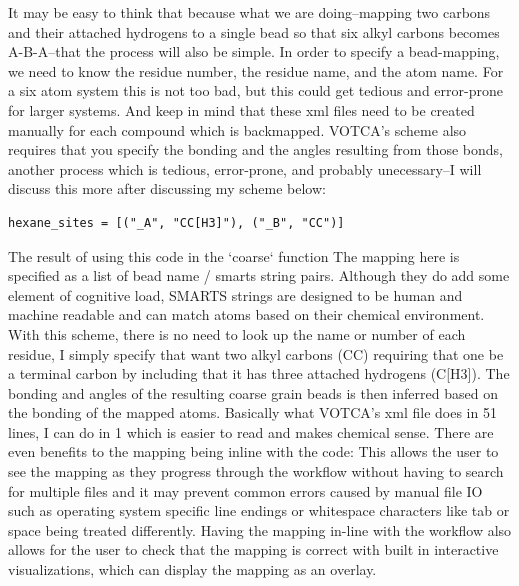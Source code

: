 It may be easy to think that because what we are doing--mapping two carbons and their attached hydrogens to a single bead so that six alkyl carbons becomes A-B-A--that the process will also be simple.
In order to specify a bead-mapping, we need to know the residue number, the residue name, and the atom name.
For a six atom system this is not too bad, but this could get tedious and error-prone for larger systems.
And keep in mind that these xml files need to be created manually for each compound which is backmapped.
VOTCA's scheme also requires that you specify the bonding and the angles resulting from those bonds, another process which is tedious, error-prone, and probably unecessary--I will discuss this more after discussing my scheme below:
\begin{lstlisting}
hexane_sites = [("_A", "CC[H3]"), ("_B", "CC")]
\end{lstlisting}
The result of using this code in the `coarse` function %
The mapping here is specified as a list of bead name / smarts string pairs.
Although they do add some element of cognitive load, SMARTS strings are designed to be human and machine readable and can match atoms based on their chemical environment.
With this scheme, there is no need to look up the name or number of each residue, I simply specify that want two alkyl carbons (CC) requiring that one be a terminal carbon by including that it has three attached hydrogens (C[H3]).
The bonding and angles of the resulting coarse grain beads is then inferred based on the bonding of the mapped atoms.
Basically what VOTCA's xml file does in 51 lines, I can do in 1 which is easier to read and makes chemical sense. 
There are even benefits to the mapping being inline with the code:
This allows the user to see the mapping as they progress through the workflow without having to search for multiple files and it may prevent common errors caused by manual file IO such as operating system specific line endings or whitespace characters like tab or space being treated differently.
Having the mapping in-line with the workflow also allows for the user to check that the mapping is correct with built in interactive visualizations, which can display the mapping as an overlay. %


